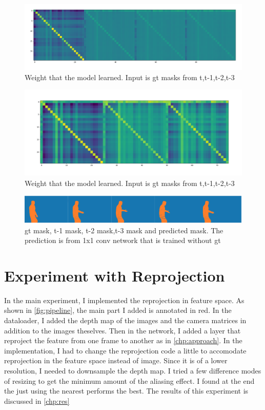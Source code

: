 \begin{figure}
\centering
\includegraphics[scale=0.22]{fig/weights_4.png}
\caption{Weight that the model learned. Input is gt masks from t,t-1,t-2,t-3}
\label{fig:w4}
\end{figure}
\begin{figure}
\centering
\includegraphics[scale=0.22]{fig/weights_3.png}
\caption{Weight that the model learned. Input is gt masks from t,t-1,t-2,t-3}
\label{fig:w3}
\end{figure}

\begin{figure}
\centering
\includegraphics[scale=0.23]{fig/pred.png}
\caption{gt mask, t-1 mask, t-2 mask,t-3 mask and predicted mask. The prediction is from 1x1 conv network that is trained without gt}
\label{fig:plot1}
\end{figure}




\section{Experiment with Reprojection}
In the main experiment, I implemented the reprojection in feature space. As shown in \ref{fig:pipeline}, the main part I added is annotated in red. In the dataloader, I added the depth map of the images and the camera matrices in addition to the images theselves. Then in the network, I added a layer that reproject the feature from one frame to another as in \ref{chp:approach}. In the implementation, I had to change the reprojection code a little to accomodate reprojection in the feature space instead of image. Since it is of a lower resolution, I needed to downsample the depth map. I tried a few difference modes of resizing to get the minimum amount of the aliasing effect. I found at the end the just using the nearest performs the best. The results of this experiment is discussed in \ref{chp:res}

